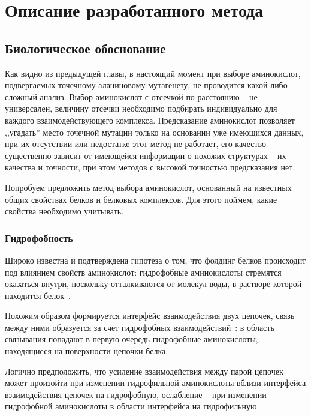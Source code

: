 \graphicspath{{../images/algorithm/}}
\chapter{Описание разработанного метода}

\section{Биологическое обоснование}
Как видно из предыдущей главы,  в настоящий момент при выборе аминокислот, подвергаемых точечному аланиновому мутагенезу, не проводится какой-либо сложный анализ. Выбор аминокислот с отсечкой по расстоянию -- не универсален, величину отсечки необходимо подбирать индивидуально для каждого взаимодействующего комплекса. Предсказание аминокислот позволяет ,,угадать'' место точечной мутации только на основании уже имеющихся данных, при их отсутствии или недостатке этот метод не работает, его качество существенно зависит от имеющейся информации о похожих структурах -- их качества и точности, при этом методов с высокой точностью предсказания нет. 

Попробуем предложить метод выбора аминокислот, основанный на известных общих свойствах белков и белковых комплексов. Для этого поймем, какие свойства необходимо учитывать.


\subsection{Гидрофобность}
Широко известна и подтверждена гипотеза о том, что фолдинг белков происходит под влиянием свойств аминокислот: гидрофобные аминокислоты стремятся оказаться внутри, поскольку отталкиваются от молекул воды, в растворе которой находится белок~\cite{hydrophobic}.

Похожим образом формируется интерфейс взаимодействия двух цепочек, связь между ними образуется за счет гидрофобных взаимодействий~\cite{hydrophobic2chain}: в область связывания попадают в первую очередь гидрофобные аминокислоты, находящиеся на поверхности цепочки белка.

Логично предположить, что усиление взаимодействия между парой цепочек может произойти при изменении гидрофильной аминокислоты вблизи интерфейса взаимодействия цепочек на гидрофобную, ослабление -- при изменении гидрофобной аминокислоты в области интерфейса на гидрофильную.

